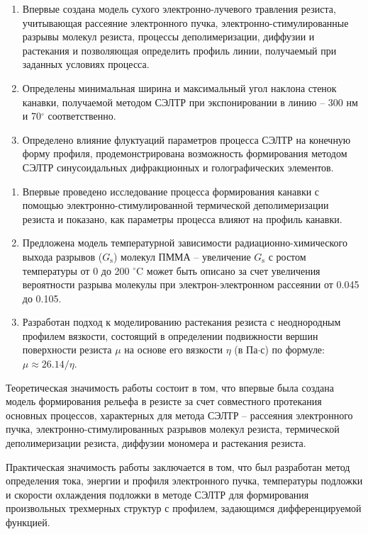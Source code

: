 \begin{enumerate}
	\item Впервые создана модель сухого электронно-лучевого травления резиста, учитывающая рассеяние электронного пучка, электронно-стимулированные разрывы молекул резиста, процессы деполимеризации, диффузии и растекания и позволяющая определить профиль линии, получаемый при заданных условиях процесса.
	\item Определены минимальная ширина и максимальный угол наклона стенок канавки, получаемой методом СЭЛТР при экспонировании в линию -- 300 нм и 70$^\circ$ соответственно.
	\item Определено влияние флуктуаций параметров процесса СЭЛТР на конечную форму профиля, продемонстрирована возможность формирования методом СЭЛТР синусоидальных дифракционных и голографических элементов.
\end{enumerate}


\novelty
\begin{enumerate}
	\item Впервые проведено исследование процесса формирования канавки с помощью электронно-стимулированной термической деполимеризации резиста и показано, как параметры процесса влияют на профиль канавки.
	\item Предложена модель температурной зависимости радиационно-химического выхода разрывов ($G_\mathrm{s}$) молекул ПММА -- увеличение $G_\mathrm{s}$ с ростом температуры от 0 до 200 $^\circ$C может быть описано за счет увеличения вероятности разрыва молекулы при электрон-электронном рассеянии от 0.045 до 0.105.
	\item Разработан подход к моделированию растекания резиста с неоднородным профилем вязкости, состоящий в определении подвижности вершин поверхности резиста $\mu$ на основе его вязкости $\eta$ (в Па$\cdot$с) по формуле: $\mu \approx 26.14 / \eta$.
\end{enumerate}


\influence
Теоретическая значимость работы состоит в том, что впервые была создана модель формирования рельефа в резисте за счет совместного протекания основных процессов, характерных для метода СЭЛТР -- рассеяния электронного пучка, электронно-стимулированных разрывов молекул резиста, термической деполимеризации резиста, диффузии мономера и растекания резиста.


Практическая значимость работы заключается в том, что был разработан метод определения тока, энергии и профиля электронного пучка, температуры подложки и скорости охлаждения подложки в методе СЭЛТР для формирования произвольных трехмерных структур с профилем, задающимся дифференцируемой функцией.


